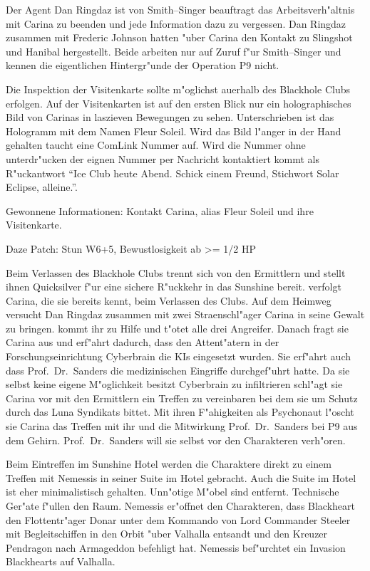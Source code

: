 Der Agent {\emph{}Dan Ringdaz} ist von Smith--Singer beauftragt das Arbeitsverh"altnis mit Carina zu beenden und jede Information dazu zu vergessen. Dan Ringdaz zusammen mit Frederic Johnson hatten "uber Carina den Kontakt zu Slingshot und Hanibal hergestellt. Beide arbeiten nur auf Zuruf f"ur Smith--Singer und kennen die eigentlichen Hintergr"unde der Operation P9 nicht.

Die Inspektion der Visitenkarte sollte m"oglichst au\3erhalb des Blackhole Clubs erfolgen. Auf der Visitenkarten ist auf den ersten Blick nur ein holographisches Bild von Carinas in laszieven Bewegungen zu sehen. Unterschrieben ist das Hologramm mit dem Namen Fleur Soleil. Wird das Bild l"anger in der Hand gehalten taucht eine ComLink Nummer auf. Wird die Nummer ohne unterdr"ucken der eignen Nummer per Nachricht kontaktiert kommt als R"uckantwort "`Ice Club heute Abend. Schick einem Freund, Stichwort Solar Eclipse, alleine."'.

\begin{remarks}
	Gewonnene Informationen: Kontakt Carina, alias Fleur Soleil und ihre Visitenkarte.

	Daze Patch: Stun W6+5, Bewustlosigkeit ab >= 1/2 HP
\end{remarks}



Beim Verlassen des Blackhole Clubs trennt sich \xl{} von den Ermittlern und stellt ihnen Quicksilver f"ur eine sichere R"uckkehr in das Sunshine bereit. \xl{} verfolgt Carina, die sie bereits kennt, beim Verlassen des Clubs. Auf dem Heimweg versucht Dan Ringdaz zusammen mit zwei Stra\3enschl"ager Carina in seine Gewalt zu bringen. \xl{} kommt ihr zu Hilfe und t"otet alle drei Angreifer. Danach fragt sie Carina aus und erf"ahrt dadurch, dass den Attent"atern in der Forschungseinrichtung Cyberbrain die KIs eingesetzt wurden. Sie erf"ahrt auch dass Prof.~Dr.~Sanders die medizinischen Eingriffe durchgef"uhrt hatte. Da sie selbst keine eigene M"oglichkeit besitzt Cyberbrain zu infiltrieren schl"agt sie Carina vor mit den Ermittlern ein Treffen zu vereinbaren bei dem sie um Schutz durch das Luna Syndikats bittet. Mit ihren F"ahigkeiten als Psychonaut l"oscht sie Carina das Treffen mit ihr und die Mitwirkung Prof.~Dr.~Sanders bei P9 aus dem Gehirn. Prof.~Dr.~Sanders will sie selbst vor den Charakteren verh"oren.

Beim Eintreffen im Sunshine Hotel werden die Charaktere direkt zu einem Treffen mit Nemessis in seiner Suite im Hotel gebracht. Auch die Suite im Hotel ist eher minimalistisch gehalten. Unn"otige M"obel sind entfernt. Technische Ger"ate f"ullen den Raum. Nemessis er"offnet den Charakteren, dass Blackheart den Flottentr"ager Donar unter dem Kommando von Lord Commander Steeler mit Begleitschiffen in den Orbit "uber Valhalla entsandt und den Kreuzer Pendragon nach Armageddon befehligt hat. Nemessis bef"urchtet ein Invasion Blackhearts auf Valhalla.

